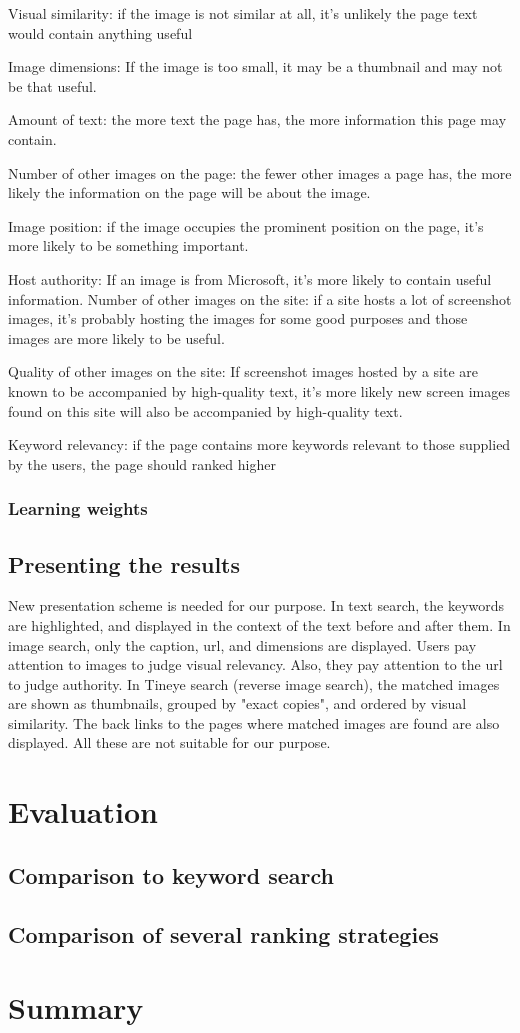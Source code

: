 Visual similarity: if the image is not similar at all, it's
unlikely the page text would contain anything useful

Image dimensions: If the image is too small, it may be a thumbnail
and may not be that useful.

Amount of text: the more text the page has, the more information
this page may contain.

Number of other images on the page: the fewer other images a page
has, the more likely the information on the page will be about the
image.

Image position: if the image occupies the prominent position on
the page, it's more likely to be something important.

Host authority: If an image is from Microsoft, it's more likely to
contain useful information. Number of other images on the site: if
a site hosts a lot of screenshot images, it's probably hosting the
images for some good purposes and those images are more likely to
be useful.

Quality of other images on the site: If screenshot images hosted
by a site are known to be accompanied by high-quality text, it's
more likely new screen images found on this site will also be
accompanied by high-quality text.

Keyword relevancy: if the page contains more keywords relevant to
those supplied by the users, the page should ranked higher

\subsubsection{Learning weights}

\subsection{Presenting the results}

New presentation scheme is needed for our purpose. In text search,
the keywords are highlighted, and displayed in the context of the
text before and after them. In image search, only the caption,
url, and dimensions are displayed. Users pay attention to images
to judge visual relevancy. Also, they pay attention to the url to
judge authority. In Tineye search (reverse image search), the
matched images are shown as thumbnails, grouped by "exact copies",
and ordered by visual similarity. The back links to the pages
where matched images are found are also displayed. All these are
not suitable for our purpose.





\section{Evaluation}

\subsection{Comparison to keyword search}

\subsection{Comparison of several ranking strategies}

\section{Summary}
